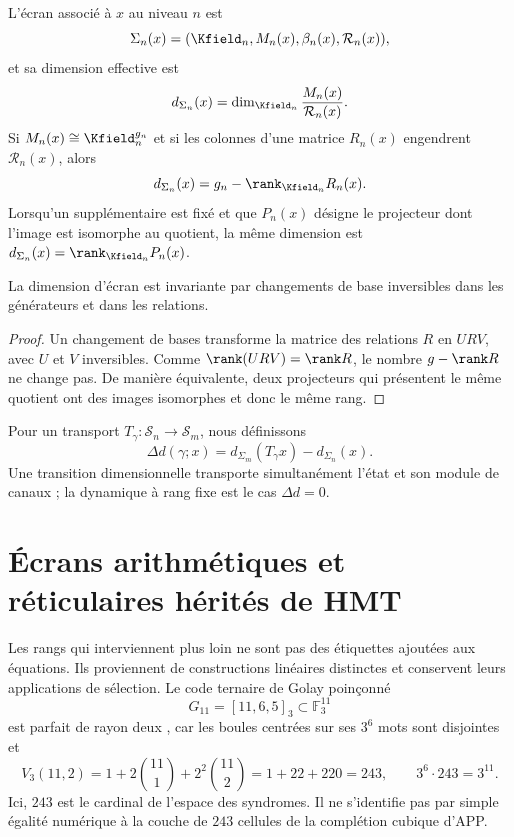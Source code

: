 \begin{definition}
L'écran associé à \(x\) au niveau \(n\) est
\[
 \Sigma_n(x)=
 (\Kfield_n,M_n(x),\beta_n(x),\mathcal R_n(x)),
\]
et sa dimension effective est
\[
 d_{\Sigma_n}(x)=
 \dim_{\Kfield_n}\frac{M_n(x)}{\mathcal R_n(x)}.
\]
Si \(M_n(x)\cong\Kfield_n^{g_n}\) et si les colonnes d'une matrice
\(R_n(x)\) engendrent \(\mathcal R_n(x)\), alors
\[
 d_{\Sigma_n}(x)=g_n-\rank_{\Kfield_n}R_n(x).
\]
Lorsqu'un supplémentaire est fixé et que \(P_n(x)\) désigne le projecteur dont l'image est
isomorphe au quotient, la même dimension est
\(d_{\Sigma_n}(x)=\rank_{\Kfield_n}P_n(x)\).
\end{definition}

\begin{proposition}
La dimension d'écran est invariante par changements de base inversibles dans
les générateurs et dans les relations.
\end{proposition}
\begin{proof}
Un changement de bases transforme la matrice des relations \(R\) en \(URV\), avec
\(U\) et \(V\) inversibles. Comme \(\rank(URV)=\rank R\), le nombre
\(g-\rank R\) ne change pas. De manière équivalente, deux projecteurs qui présentent le
même quotient ont des images isomorphes et donc le même rang.
\end{proof}

Pour un transport \(T_\gamma:\mathcal S_n\to\mathcal S_m\), nous définissons
\[
 \Delta d(\gamma;x)=
 d_{\Sigma_m}(T_\gamma x)-d_{\Sigma_n}(x).
\]
Une transition dimensionnelle transporte simultanément l'état et son module
de canaux ; la dynamique à rang fixe est le cas \(\Delta d=0\).

\section{Écrans arithmétiques et réticulaires hérités de HMT}

Les rangs qui interviennent plus loin ne sont pas des étiquettes ajoutées aux
équations. Ils proviennent de constructions linéaires distinctes et conservent leurs
applications de sélection. Le code ternaire de Golay poinçonné
\[
 G_{11}=[11,6,5]_3\subset\mathbb F_3^{11}
\]
est parfait de rayon deux \cite{MacWilliamsSloane1977}, car les boules
centrées sur ses \(3^6\) mots sont
disjointes et
\[
 V_3(11,2)=1+2\binom{11}{1}+2^2\binom{11}{2}
 =1+22+220=243,
\qquad
 3^6\cdot243=3^{11}.
\]
Ici, \(243\) est le cardinal de l'espace des syndromes. Il ne s'identifie pas par
simple égalité numérique à la couche de \(243\) cellules de la complétion
cubique d'APP\@.

